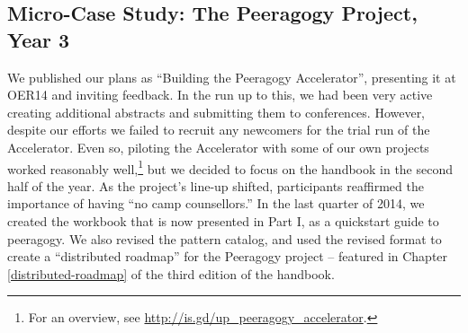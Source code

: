 \subsection{{\tiny Micro-}Case Study: The Peeragogy Project, Year 3}

We published our plans as ``Building the Peeragogy Accelerator'',
presenting it at OER14 and inviting feedback.  In the run up to this,
we had been very active creating additional abstracts and submitting
them to conferences.  However, despite our efforts we failed to
recruit any newcomers for the trial run of the Accelerator.  Even so,
piloting the Accelerator with some of our own projects worked
reasonably well,\footnote{For an overview,
see \url{http://is.gd/up_peeragogy_accelerator}.} but we decided to
focus on the handbook in the second half of the year.  As the
project's line-up shifted, participants reaffirmed the importance of
having ``no camp counsellors.''  In the last quarter of 2014, we
created the workbook that is now presented in Part I, as a quickstart
guide to peeragogy.  We also revised the pattern catalog, and used the
revised format to create a ``distributed roadmap'' for the Peeragogy
project -- featured in Chapter \ref{distributed-roadmap} of the third
edition of the handbook.

